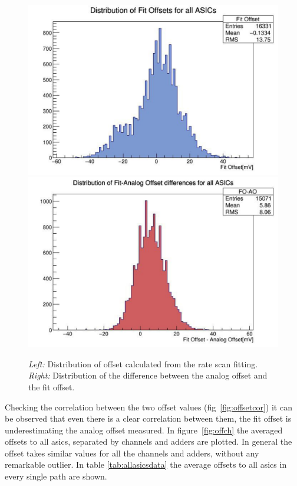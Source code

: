 \documentclass[main.tex]{subfiles}
\begin{document}
\begin{figure}[h]
  \centering
  \includegraphics[width=\textwidth]{./Pictures/fitoffsetdist.pdf}
  \endminipage
  \includegraphics[width=\textwidth]{./Pictures/diffoffsetdif.pdf}
  \endminipage
  \caption{\textit{Left:} Distribution of offset calculated from the rate scan fitting. \textit{Right:} Distribution of the difference between the analog offset and the fit offset.}
  \label{fig:fitoffdist}
\end{figure}
Checking the correlation between the two offset values (fig~\ref{fig:offsetcor}) it can be observed that even there is a clear correlation between them, the fit offset is underestimating the analog offset measured.
In figure~\ref{fig:offch} the averaged offsets to all \glspl{asic}, separated by channels and adders are plotted. In general the offset takes similar values for all the channels and adders, without any remarkable outlier.
In table \ref{tab:allasicsdata} the average offsets to all \glspl{asic} in every single path are shown.
\end{document}

